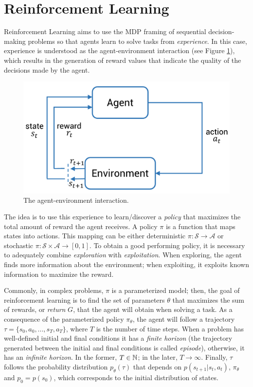 \section[Reinforcement Learning]{Reinforcement Learning \cite{sutton2018reinforcement, kober2013reinforcement}}
Reinforcement Learning aims to use the MDP framing of sequential decision-making problems so that agents learn to solve tasks from \emph{experience}. In this case, experience is understood as the agent-environment interaction (see Figure \ref{fig:agent-environment}), which results in the generation of reward values that indicate the quality of the decisions made by the agent. 

\begin{figure}[h]
    \centering
    \includegraphics[width=0.6\linewidth]{imagenes/cap1/agent_environment.pdf}
    \caption{The agent-environment interaction.}
    \label{fig:agent-environment}
\end{figure}

The idea is to use this experience to learn/discover a \emph{policy} that maximizes the total amount of reward the agent receives. A policy $\pi$ is a function that maps states into actions. This mapping can be either deterministic $\pi: \mathcal{S} \to \mathcal{A}$ or stochastic $\pi: \mathcal{S} \times \mathcal{A} \to [0,1]$. To obtain a good performing policy, it is necessary to adequately combine \emph{exploration} with \emph{exploitation}. When exploring, the agent finds more information about the environment; when exploiting, it exploits known information to maximize the reward.

Commonly, in complex problems, $\pi$ is a parameterized model; then, the goal of reinforcement learning is to find the set of parameters $\theta$ that maximizes the sum of rewards, or \emph{return} $G$, that the agent will obtain when solving a task. As a consequence of the parameterized policy $\pi_{\theta}$, the agent will follow a trajectory $\tau = \{s_{0}, a_{0},...,s_{T}, a_{T}\}$, where $T$ is the number of time steps. When a problem has well-defined initial and final conditions it has a \emph{finite horizon} (the trajectory generated between the initial and final conditions is called \emph{episode}), otherwise, it has an \emph{infinite horizon}. In the former, $T \in \mathbb{N}$; in the later, $T \to \infty$. Finally, $\tau$ follows the probability distribution $p_{\theta}(\tau)$ that depends on $p(s_{t+1}|s_{t}, a_{t})$, $\pi_{\theta}$ and $p_{0}=p(s_{0})$, which corresponds to the initial distribution of states.

